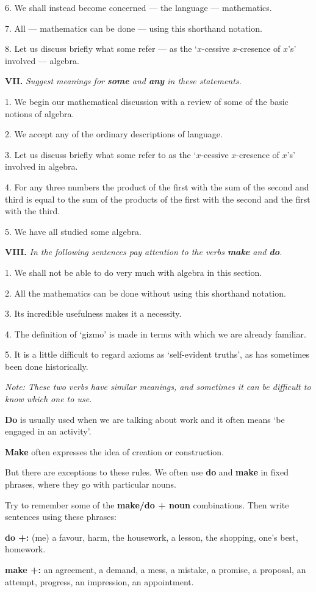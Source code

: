 \documentclass[a4paper]{article}
\newcommand{\ETask}[2]{\medskip\par\textbf{#1.} \textit{#2}\par}
\begin{document}
6. We shall instead become concerned --- the language --- mathematics.

7. All --- mathematics can be done --- using this shorthand notation.

8. Let us discuss briefly what some refer --- as the `$x$-cessive $x$-cresence of $x$'s' involved --- algebra.

\ETask{VII}{Suggest meanings for \textbf{some} and \textbf{any} in these statements.}
1. We begin our mathematical discussion with a review of some of the basic notions of algebra.

2. We accept any of the ordinary descriptions of language.

3. Let us discuss briefly what some refer to as the `$x$-cessive $x$-cresence of $x$'s' involved in algebra.

4. For any three numbers the product of the first with the sum of the second and third is equal to the sum
of the products of the first with the second and the first with the third.

5. We have all studied some algebra.

\ETask{VIII}{In the following sentences pay attention to the verbs \textbf{make} and \textbf{do}.}
1. We shall not be able to do very much with algebra in this section.

2. All the mathematics can be done without using this shorthand notation.

3. Its incredible usefulness makes it a necessity.

4. The definition of `gizmo' is made in terms with which we are already familiar.

5. It is a little difficult to regard axioms as `self-evident truths', as has sometimes been done historically.

{\it Note: These two verbs have similar meanings, and sometimes it can be difficult to know which one to use.

\textbf{Do} is usually used when we are talking about work and it often means `be engaged in an activity'.

\textbf{Make} often expresses the idea of creation or construction.

But there are exceptions to these rules. We often use \textbf{do} and \textbf{make} in fixed phrases, where they go with particular nouns.

Try to remember some of the \textbf{make/do + noun} combinations. Then write sentences using these phrases:

\textbf{do +:} (me) a favour, harm, the housework, a lesson, the shopping, one's best, homework.

\textbf{make +:} an agreement, a demand, a mess, a mistake, a promise, a proposal, an attempt, progress, an impression, an appointment.
}
\end{document}

